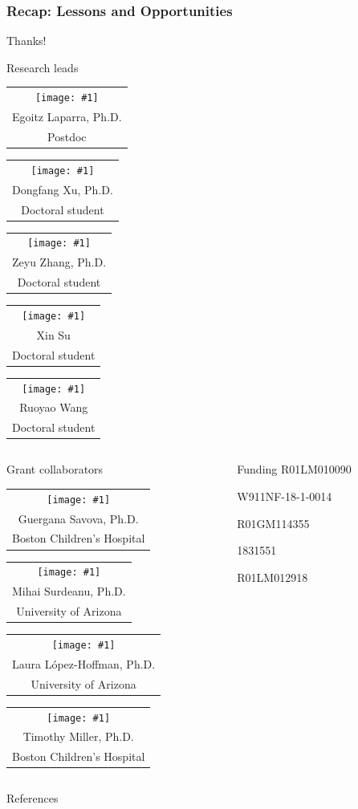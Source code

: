 \documentclass[14pt,aspectratio=169]{beamer}
\newcommand{\headshot}[3]{{\tiny\setlength{\tabcolsep}{0pt}%
\begin{tabular}{c}
\texttt{[image: \#1]} \\
#2 \\
#3
\end{tabular}}}
\newcommand{\raisegraphics}[3]{\raisebox{-#1\height}{\texttt{[image: \#3]}}}
\newcommand{\funding}[2]{\raisegraphics{.2}{height=.05\textheight}{#1} #2}
\begin{document}
\begin{frame}
    \frametitle{Recap: Lessons and Opportunities}
    \tableofcontents
\end{frame}

\begin{frame}{Thanks!}
\begin{block}{Research leads}
\headshot{people/laparra-egoitz.jpg}{Egoitz Laparra, Ph.D.}{Postdoc}
\qquad
\headshot{people/xu-dongfang.jpeg}{Dongfang Xu, Ph.D.}{Doctoral student}
\qquad
\headshot{people/zhang-zeyu.png}{Zeyu Zhang, Ph.D.}{Doctoral student}
\qquad
\headshot{people/su-xin.jpg}{Xin Su}{Doctoral student}
\qquad
\headshot{people/wang-ruoyao.png}{Ruoyao Wang}{Doctoral student}
\end{block}
\begin{columns}
\begin{column}{0.65\textwidth}
\begin{block}{Grant collaborators}
\headshot{people/savova-guergana.jpg}{Guergana Savova, Ph.D.}{Boston Children's Hospital}
\headshot{people/surdeanu-mihai.jpeg}{Mihai Surdeanu, Ph.D.}{University of Arizona}
\headshot{people/lopez-hoffmann-laura.jpg}{Laura L\'{o}pez-Hoffman, Ph.D.}{University of Arizona}
\headshot{people/miller-timothy.jpg}{Timothy Miller, Ph.D.}{Boston Children's Hospital}
\end{block}
\end{column}
\hfill
\begin{column}{0.3\textwidth}
\begin{block}{Funding}
\scriptsize
\funding{funding/nih_nlm.png}{R01LM010090}

\funding{funding/darpa.png}{W911NF-18-1-0014}

\funding{funding/nih_nigms.jpg}{R01GM114355}

\funding{funding/nsf.png}{1831551}

\funding{funding/nih_nlm.png}{R01LM012918}
\end{block}
\end{column}
\end{columns}
\end{frame}


\appendix

\begin{frame}[allowframebreaks]{References}
\printbibliography
\end{frame}
\end{document}
